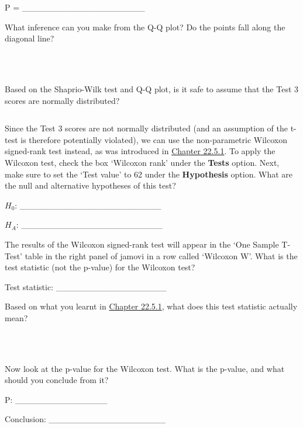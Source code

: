 \documentclass[
  openany]{scrbook}
\begin{document}
P = \_\_\_\_\_\_\_\_\_\_\_\_\_\_\_\_\_\_\_\_

What inference can you make from the Q-Q plot?
Do the points fall along the diagonal line?

\begin{verbatim}



\end{verbatim}

Based on the Shaprio-Wilk test and Q-Q plot, is it safe to assume that the Test 3 scores are normally distributed?

\begin{verbatim}

\end{verbatim}

Since the Test 3 scores are not normally distributed (and an assumption of the t-test is therefore potentially violated), we can use the non-parametric Wilcoxon signed-rank test instead, as was introduced in \protect\hyperlink{wilcoxon-test}{Chapter 22.5.1}.
To apply the Wilcoxon test, check the box `Wilcoxon rank' under the \textbf{Tests} option.
Next, make sure to set the `Test value' to 62 under the \textbf{Hypothesis} option.
What are the null and alternative hypotheses of this test?

\(H_{0}\): \_\_\_\_\_\_\_\_\_\_\_\_\_\_\_\_\_\_\_\_\_\_\_

\(H_{A}\): \_\_\_\_\_\_\_\_\_\_\_\_\_\_\_\_\_\_\_\_\_\_\_

The results of the Wilcoxon signed-rank test will appear in the `One Sample T-Test' table in the right panel of jamovi in a row called `Wilcoxon W'.
What is the test statistic (not the p-value) for the Wilcoxon test?

Test statistic: \_\_\_\_\_\_\_\_\_\_\_\_\_\_\_\_\_\_

Based on what you learnt in \protect\hyperlink{wilcoxon-test}{Chapter 22.5.1}, what does this test statistic actually mean?

\begin{verbatim}



\end{verbatim}

Now look at the p-value for the Wilcoxon test.
What is the p-value, and what should you conclude from it?

P: \_\_\_\_\_\_\_\_\_\_\_\_\_\_\_

Conclusion: \_\_\_\_\_\_\_\_\_\_\_\_\_\_\_\_\_\_\_
\end{document}
